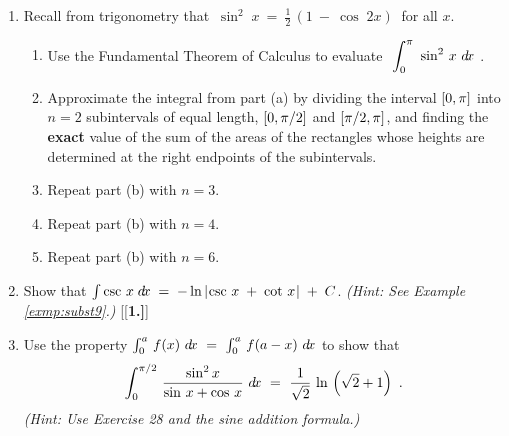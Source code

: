 {\begin{enumerate}[\bfseries 1.]
 \item Recall from trigonometry that $~\sin^2 \;x ~=~ \frac{1}{2}\,(1 ~-~
  \cos\;2x)~$ for all $x$.
  \begin{enumerate}[\bfseries (a)]
   \item Use the Fundamental Theorem of Calculus to evaluate
    $~\displaystyle\int_{0}^{\pi}~\sin^2\,x~d\!x~$.
   \item Approximate the integral from part (a) by dividing the interval
    $\lbrack 0,\pi \rbrack$ into $n=2$ subintervals of equal length, $\lbrack 0,\pi/2 \rbrack$
    and $\lbrack \pi/2,\pi \rbrack$, and finding the \textbf{exact} value of the sum of
    the areas of the rectangles	whose heights are determined at the right
    endpoints of the subintervals.
   \item Repeat part (b) with $n=3$.
   \item Repeat part (b) with $n=4$.
   \item Repeat part (b) with $n=6$.
  \end{enumerate}
 \item Show that $\int \csc\,x\;d\!x \;=\; -\ln\,\lvert\mspace{1mu}\csc\,x \;+\; \cot\,x\mspace{1mu}\rvert \;+\; C$.
 \emph{(Hint: See Example \ref{exmp:subst9}.)}
[{[\bfseries 1.]}]
 \item Use the property $\int_0^a \,f(x)~d\!x ~=~ \int_0^a \,f(a-x)~d\!x$ to show that
\[
\displaystyle\int_0^{\pi/2}\,\dfrac{\sin^2 x}{\sin\,x + \cos\,x}~d\!x ~=~ 
\dfrac{1}{\sqrt{2}}\,\ln\,\left(\sqrt{2} + 1\right)~.
\]
\emph{(Hint: Use Exercise 28 and the sine addition formula.)}

\end{enumerate}}
